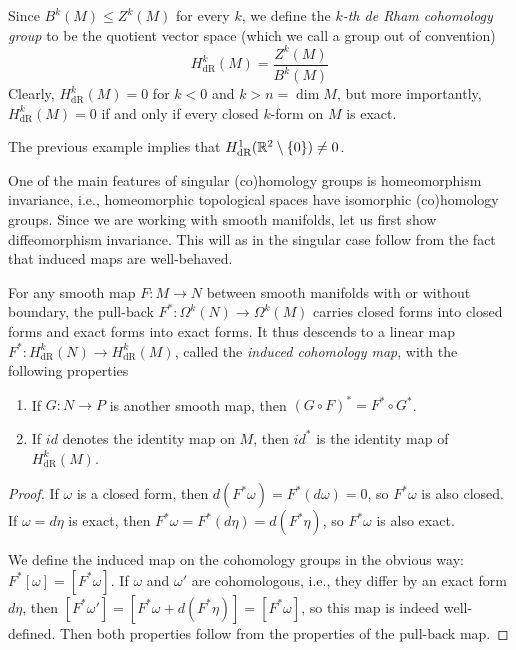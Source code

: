 \documentclass[a4paper, 12pt]{article}
\begin{document}
Since $B^k(M) \leq Z^k(M)$ for every $k$, we define the \emph{$k$-th de Rham cohomology group} to be the quotient vector space (which we call a group out of convention)
\[
    H_{\text{dR}}^k(M) = \frac{Z^k(M)}{B^k(M)}
\]
Clearly, $H_{\text{dR}}^k(M) = 0$ for $k < 0$ and $k > n = \dim M$, but more importantly,
$H_{\text{dR}}^k(M) = 0$ if and only if  every closed $k$-form on $M$ is exact.
\begin{example}
    The previous example implies that $H_{\text{dR}}^1(\mathbb{R}^2\setminus\lbrace 0\rbrace) \neq 0$.
\end{example}
One of the main features of singular (co)homology groups is homeomorphism invariance, i.e., homeomorphic topological spaces have isomorphic (co)homology groups.
Since we are working with smooth manifolds, let us first show diffeomorphism invariance.
This will as in the singular case follow from the fact that induced maps are well-behaved.
\begin{proposition}
    For any smooth map $F \colon M \to N$ between smooth manifolds with or without boundary,
    the pull-back $F^* \colon \Omega^k(N) \to \Omega^k(M)$ carries closed forms into closed forms and exact forms into exact forms.
    It thus descends to a linear map $F^* \colon H_{\text{dR}}^k(N) \to H_{\text{dR}}^k(M)$, called the \emph{induced cohomology map},
    with the following properties
    \begin{enumerate}[label=(\alph*)]
        \item If $G \colon N \to P$ is another smooth map, then $(G\circ F)^* = F^* \circ G^*$.
        \item If $id$ denotes the identity map on $M$, then $id^*$ is the identity map of $H_{\text{dR}}^k(M)$.
    \end{enumerate}
\end{proposition}
\begin{proof}
    If $\omega$ is a closed form, then $d(F^*\omega) = F^*(d\omega) = 0$, so $F^*\omega$ is also closed.
    If $\omega = d\eta$ is exact, then $F^*\omega = F^*(d\eta) = d(F^*\eta)$, so $F^*\omega$ is also exact.

    We define the induced map on the cohomology groups in the obvious way: $F^*[\omega] = [F^*\omega]$.
    If $\omega$ and $\omega'$ are cohomologous, i.e., they differ by an exact form $d\eta$,
    then $[F^*\omega'] = [F^*\omega + d(F^*\eta)] = [F^*\omega]$, so this map is indeed well-defined.
    Then both properties follow from the properties of the pull-back map.
\end{proof}
\end{document}
